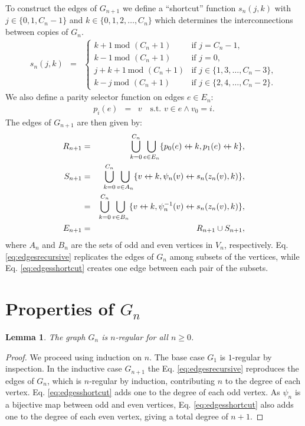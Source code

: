 \documentclass{article}
\newcommand{\beq}{\begin{eqnarray}}
\newcommand{\eeq}{\end{eqnarray}}
\newcommand{\append}{\leftarrow{\mkern-18mu}{+}\:}
\newtheorem{lemma}{Lemma}
\begin{document}
To construct the edges of $G_{n+1}$ we define a ``shortcut'' function $s_n(j, k)$
with $j \in \{0, 1, C_n - 1\}$ and $k \in \{0, 1, 2, \ldots, C_n\}$ which
determines the interconnections between copies of $G_n$.
\beq
\label{eq:shortcut}
s_{n}(j, k)
&=&
\begin{cases}
k + 1 \ \mbox{mod } (C_n + 1)
&
\mbox{if } j = C_n - 1,
\\
k - 1 \ \mbox{mod } (C_n + 1)
&
\mbox{if } j = 0,
\\
j + k + 1 \ \mbox{mod } (C_n + 1)
&
\mbox{if } j \in \{1, 3, \ldots, C_n - 3\},
\\
k - j \ \mbox{mod } (C_n + 1)
&
\mbox{if } j \in \{2, 4, \ldots, C_n - 2\}.
\end{cases}
\eeq
We also define a parity selector function on edges $e \in E_n$:
\beq
p_i(e)
&=&
v \quad \mbox{s.t. } v \in e \land v_0 = i.
\eeq
The edges of $G_{n+1}$ are then given by:
\beq
\label{eq:edgesrecursive}
R_{n+1}
&=&
\bigcup_{k=0}^{C_n}
\bigcup_{e \in E_n} \{ p_0(e) \append k, p_1(e) \append k\},
\\
\label{eq:edgesshortcut}
S_{n+1}
&=&
\bigcup_{k=0}^{C_n}
\bigcup_{v \in A_n} \{ v \append k, \psi_n(v) \append s_n(z_n(v), k) \},
\\
&=&
\bigcup_{k=0}^{C_n}
\bigcup_{v \in B_n} \{ v \append k, \psi_n^{-1}(v) \append s_n(z_n(v), k) \},
\\
E_{n+1}
&=&
R_{n+1} \cup S_{n+1},
\eeq
where $A_n$ and $B_n$ are the sets of odd and even vertices in $V_n$,
respectively.
Eq. \ref{eq:edgesrecursive} replicates the edges of
$G_n$ among subsets of the vertices,
while Eq. \ref{eq:edgesshortcut} creates one edge between each pair of the subsets.

\section{Properties of $G_n$}

\begin{lemma}
\label{lem:regular}
The graph $G_n$ is $n$-regular for all $n \geq 0$.
\end{lemma}
\begin{proof}
We proceed using induction on $n$.
The base case $G_1$ is $1$-regular by inspection.
In the inductive case $G_{n+1}$
the Eq. \ref{eq:edgesrecursive}
reproduces the edges of $G_n$,
which is $n$-regular by induction,
contributing $n$ to the degree of each vertex.
Eq. \ref{eq:edgesshortcut} adds one to the degree of each odd vertex.
As $\psi_n$ is a bijective map between odd and even vertices,
Eq. \ref{eq:edgesshortcut} also adds one to the degree of each even vertex,
giving a total degree of $n + 1$.
\end{proof}
\end{document}
